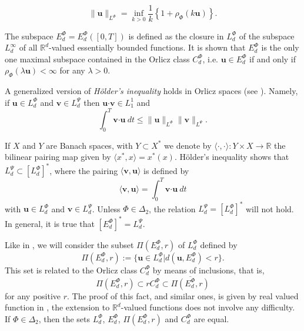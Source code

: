 \documentclass[twoside]{article}
\theoremstyle{remark}
\newcommand{\orlnor}{\|_{L^{\Phi}}}
\newcommand{\lphi}{L^{\Phi}}
\newcommand{\lpsi}{L^{\Psi}}
\newcommand{\ephi}{E^{\Phi}}
\newcommand{\claseor}{C^{\Phi}}
\renewcommand{\b}[1]{\boldsymbol{#1}}
\newcommand{\ccdot}{\b{\cdot}}
\renewcommand{\leq}{\leqslant}
\begin{document}
\begin{equation}\label{amemiya}
\|\b{u}\orlnor=\inf\limits_{k>0}\frac{1}{k}\left\{1+\rho_{\Phi}(k\b{u})\right\}.
\end{equation}



The subspace $\ephi_d=\ephi_d([0,T])$ is defined as the closure in $\lphi_d$ of the subspace $L^{\infty}_d$ of all $\mathbb{R}^d$-valued essentially bounded functions. It is shown that  $\ephi_d$ is the only one maximal subspace contained in the Orlicz class $\claseor_d$, i.e. 
$\b{u}\in\ephi_d$ if and only if $\rho_{\Phi}(\lambda \b{u})<\infty$ for any $\lambda>0$.  

A generalized version of \emph{H\"older's inequality} holds in Orlicz spaces (see \cite[Thm. 9.3]{KR} ). Namely, if $\b{u}\in\lphi_d$ and $\b{v}\in\lpsi_d$ then $\b{u}\ccdot\b{v}\in L_1^1$ and
\begin{equation}\label{holder}
\int_0^T\b{v}\ccdot\b{u}\ dt\leq \|\b{u}\orlnor\|\b{v}\|_{L^{\Psi}}.
\end{equation}




If $X$ and $Y$ are  Banach spaces, with $Y\subset X^*$ we denote by $\langle\cdot,\cdot\rangle:Y\times X\to\mathbb{R}$ the bilinear pairing  map given by $\langle x^*,x\rangle=x^*(x)$. H\"older's inequality shows that $\lpsi_d\subset \left[\lphi_d\right]^*$, where the pairing  
$\langle \b{v}, \b{u}\rangle$
is defined by 
\begin{equation}\label{pairing}
  \langle \b{v},\b{u}\rangle=\int_0^T\b{v}\ccdot\b{u}\ dt
\end{equation}
with  $\b{u}\in\lphi_d$ and $\b{v}\in\lpsi_d$.
 Unless $\Phi \in \Delta_2$, the relation $\lpsi_d= \left[\lphi_d\right]^*$ will not hold. In general, it is true  that  $\left[\ephi_d\right]^*=\lpsi_d$.


Like in \cite{KR}, we will consider the subset $\Pi(\ephi_d,r)$ of $\lphi_d$ defined by
\[\Pi(\ephi_d,r):=\{\b{u}\in\lphi_d| d(\b{u},\ephi_d)<r\}.\]
This set is related to the Orlicz class $\claseor_d$ by means of inclusions, that is,
\begin{equation}\label{inclusiones}\Pi(\ephi_d, r )\subset r \claseor_d\subset\overline{\Pi(\ephi_d,r)}
\end{equation}
for any positive $r$.
The proof of this fact, and similar ones, is given by real valued function in \cite{KR},
the extension to $\mathbb{R}^d$-valued functions does not involve any difficulty. 
If $\Phi \in \Delta_2$,  then the sets $\lphi_d$, $\ephi_d$, $\Pi(\ephi_d,r)$ and $\claseor_d$ are equal.
\end{document}
